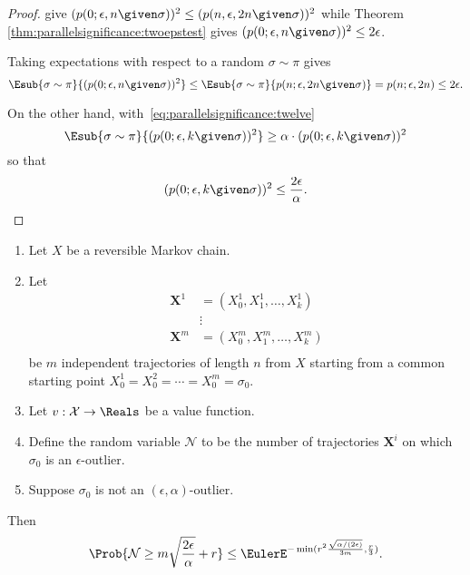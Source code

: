 \documentclass[12pt]{article}
\begin{document}
\begin{proof}
            give \( (p(0; \epsilon, n \given \sigma))^2 \le (p(n,
            \epsilon, 2n \given \sigma))^2 \) while Theorem~%
            \ref{thm:parallelsignificance:twoepstest} gives \( (p(0; \epsilon, n
            \given \sigma))^2 \le 2\epsilon \).
        \item
            Taking expectations with respect to a random \( \sigma \sim
            \pi \) gives
            \[
                \Esub{\sigma \sim \pi}{(p(0; \epsilon, n \given \sigma))^2
                } \le \Esub{\sigma \sim \pi}{p(n; \epsilon, 2n \given
                \sigma) } = p(n; \epsilon, 2n) \le 2\epsilon.
            \]
        \item
            On the other hand, with~\eqref{eq:parallelsignificance:twelve}
            \[
                \Esub{\sigma \sim \pi}{(p(0; \epsilon, k \given \sigma))^2
                } \ge \alpha \cdot (p(0; \epsilon, k \given \sigma))^2
            \] so that
            \[
                (p(0; \epsilon, k \given \sigma))^2 \le \frac{2\epsilon}
                {\alpha}.
            \]
\end{proof}

\begin{theorem}
    \label{thm:parallelsignificance:thm3point1}
    \begin{enumerate}
        \item
            Let \( X \) be a reversible Markov chain.
        \item
            Let
            \begin{align*}
                \mathbf{X}^1 &= (X_0^1, X_1^1, \dots, X_k^1 )\\
                &\vdots \\
                \mathbf{X}^m &= (X_0^m, X_1^m, \dots, X_k^m )\\
            \end{align*}
            be \( m \) independent trajectories of length \( n \) from \(
            X \) starting from a common starting point \( X_0^1 =
            X_0^2 = \cdots = X_0^m = \sigma_0 \). 
        \item
            Let \( v :  \mathcal{X} \to \Reals \) be a value function.
        \item
            Define the random variable \( \mathcal{N} \) to be the
            number of trajectories \( \mathbf{X}^i \) on which \( \sigma_0
            \) is an \( \epsilon \)-outlier.
        \item
            Suppose \( \sigma_0 \) is not an \( (\epsilon, \alpha) \)-outlier.
    \end{enumerate}
    Then
    \[
        \Prob{\mathcal{N} \ge m \sqrt{\frac{2\epsilon}{\alpha}} + r} \le
        \EulerE^{-\min(r^2 \frac{\sqrt{\alpha/(2\epsilon)}}{3m}, \frac{r}
        {3})}.
    \]
\end{theorem}
\end{document}
